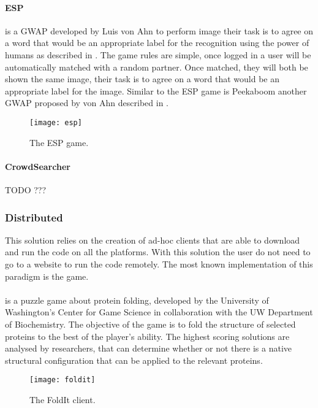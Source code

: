 \paragraph{ESP} is a \ac{GWAP} developed by Luis von Ahn to perform image
their task is to agree on a word that would be an appropriate label for the
recognition using the power of humans as described in \cite{von2004labeling}.
The game rules are simple, once logged in a user will be automatically matched
with a random partner. Once matched, they will both be shown the same image,
their task is to agree on a word that would be an appropriate label for the
image. Similar to the ESP game is Peekaboom another \ac{GWAP} proposed by von
Ahn described in \cite{von2006peekaboom}.
\begin{figure}[htb]
    \centering
    \texttt{[image: esp]}
    \caption{The ESP game.}
    \label{fig:esp}
\end{figure}


\paragraph{CrowdSearcher}
TODO ???






\subsubsection{Distributed}
This solution relies on the creation of ad-hoc clients that are able to download
and run the code on all the platforms. With this solution the user do not need
to go to a website to run the code remotely. The most known implementation of
this paradigm is the  game.\\

\paragraph{} is a puzzle game about protein folding, developed
by the University of Washington's Center for Game Science in collaboration with
the UW Department of Biochemistry. The objective of the game is to fold the
structure of selected proteins to the best of the player's ability. The highest
scoring solutions are analysed by researchers, that can determine whether or not
there is a native structural configuration that can be applied to the relevant
proteins.
\begin{figure}[htb]
    \centering
    \texttt{[image: foldit]}
    \caption{The FoldIt client.}
    \label{fig:foldit}
\end{figure}